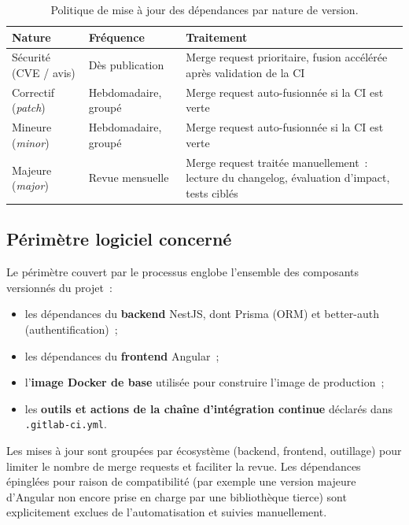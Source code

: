 \begin{table}[htbp]
    \centering
    \renewcommand{\arraystretch}{1.3}
    \begin{tabular}{|p{3.1cm}|p{3.1cm}|p{8cm}|}
        \hline
        \textbf{Nature} & \textbf{Fréquence} & \textbf{Traitement} \\
        \hline
        Sécurité (CVE / avis) & Dès publication & Merge request prioritaire, fusion accélérée après validation de la CI \\
        \hline
        Correctif (\emph{patch}) & Hebdomadaire, groupé & Merge request auto-fusionnée si la CI est verte \\
        \hline
        Mineure (\emph{minor}) & Hebdomadaire, groupé & Merge request auto-fusionnée si la CI est verte \\
        \hline
        Majeure (\emph{major}) & Revue mensuelle & Merge request traitée manuellement~: lecture du changelog, évaluation d'impact, tests ciblés \\
        \hline
    \end{tabular}
    \caption{Politique de mise à jour des dépendances par nature de version.}
    \label{tab:renovate}
\end{table}

\subsection{Périmètre logiciel concerné}
Le périmètre couvert par le processus englobe l'ensemble des composants versionnés du projet~:
\begin{itemize}
    \item les dépendances du \textbf{backend} NestJS, dont Prisma (ORM) et better-auth (authentification)~;
    \item les dépendances du \textbf{frontend} Angular~;
    \item l'\textbf{image Docker de base} utilisée pour construire l'image de production~;
    \item les \textbf{outils et actions de la chaîne d'intégration continue} déclarés dans \texttt{.gitlab-ci.yml}.
\end{itemize}
Les mises à jour sont groupées par écosystème (backend, frontend, outillage) pour limiter le nombre de merge requests et faciliter la revue. Les dépendances épinglées pour raison de compatibilité (par exemple une version majeure d'Angular non encore prise en charge par une bibliothèque tierce) sont explicitement exclues de l'automatisation et suivies manuellement.

